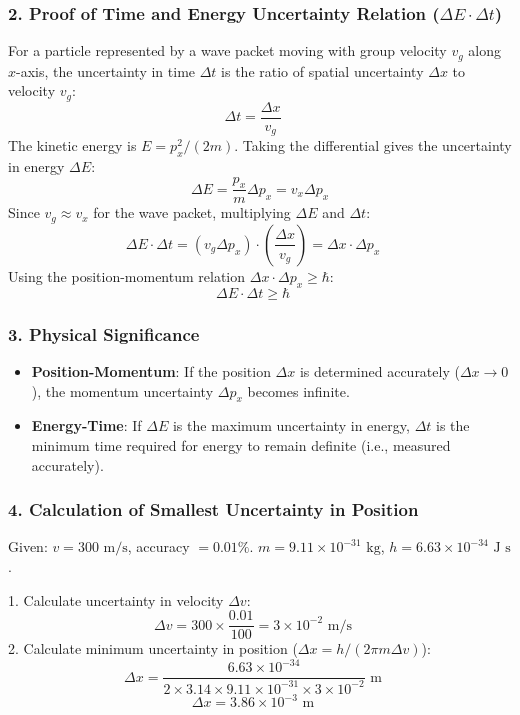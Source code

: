 \documentclass[12pt]{article}
\begin{document}
\subsubsection*{2. Proof of Time and Energy Uncertainty Relation ($\Delta E \cdot \Delta t$)}
For a particle represented by a wave packet moving with group velocity $v_g$ along $x$-axis, the uncertainty in time $\Delta t$ is the ratio of spatial uncertainty $\Delta x$ to velocity $v_g$:
$$
\Delta t = \frac{\Delta x}{v_g} \quad \text{}
$$
The kinetic energy is $E = p_x^2/(2m)$. Taking the differential gives the uncertainty in energy $\Delta E$:
$$
\Delta E = \frac{p_x}{m} \Delta p_x = v_x \Delta p_x
$$
Since $v_g \approx v_x$ for the wave packet, multiplying $\Delta E$ and $\Delta t$:
$$
\Delta E \cdot \Delta t = (v_g \Delta p_x) \cdot \left(\frac{\Delta x}{v_g}\right) = \Delta x \cdot \Delta p_x \quad \text{}
$$
Using the position-momentum relation $\Delta x \cdot \Delta p_x \geq \hbar$:
$$
\Delta E \cdot \Delta t \geq \hbar \quad \text{}
$$

\subsubsection*{3. Physical Significance}
\begin{itemize}
    \item \textbf{Position-Momentum}: If the position $\Delta x$ is determined accurately ($\Delta x \to 0$), the momentum uncertainty $\Delta p_x$ becomes infinite.
    \item \textbf{Energy-Time}: If $\Delta E$ is the maximum uncertainty in energy, $\Delta t$ is the minimum time required for energy to remain definite (i.e., measured accurately).
\end{itemize}

\subsubsection*{4. Calculation of Smallest Uncertainty in Position}
Given: $v = 300 \text{ m/s}$, accuracy $= 0.01\%$. $m = 9.11 \times 10^{-31} \text{ kg}$, $h = 6.63 \times 10^{-34} \text{ J s}$.

1.  Calculate uncertainty in velocity $\Delta v$:
    $$
    \Delta v = 300 \times \frac{0.01}{100} = 3 \times 10^{-2} \text{ m/s} \quad \text{}
    $$
2.  Calculate minimum uncertainty in position ($\Delta x = h/(2\pi m \Delta v)$):
    $$
    \Delta x = \frac{6.63 \times 10^{-34}}{2 \times 3.14 \times 9.11 \times 10^{-31} \times 3 \times 10^{-2}} \text{ m} \quad \text{}
    $$
    $$
    \Delta x = 3.86 \times 10^{-3} \text{ m} \quad \text{}
    $$
\end{document}
